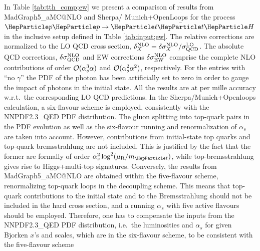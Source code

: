\documentclass[11pt]{cernrep}
\begin{document}
In Table \ref{tab:tth_comp;ew} we present a comparison of results from
{\sc MadGraph5\_aMC@NLO} and {\sc Sherpa/ Munich+OpenLoops} for the
process $\Pp\Pp\to \PQt\bar{\PQt}\PH$ in the inclusive setup defined
in Table \ref{tab:input;ew}. The relative corrections are normalized
to the LO QCD cross section, $\delta^{\rm NLO}_X =\delta\sigma^{\rm
  NLO}_X/\sigma^{\rm LO}_{\rm QCD}$.  The absolute QCD corrections, $
\delta\sigma^{\rm NLO}_{\rm QCD}$ and EW corrections
$\delta\sigma^{\rm NLO}_{\rm EW}$ comprise the complete NLO
contributions of order ${\cal O}(\alpha^3_s\alpha)$ and ${\cal
  O}(\alpha^2_s\alpha^2)$, respectively.  For the entries with ``no
$\gamma$'' the PDF of the photon has been artificially set to zero in
order to gauge the impact of photons in the initial state.  All the
results are at per mille accuracy w.r.t.~the corresponding LO QCD
predictions. In the {\sc Sherpa/Munich+Openloops} calculation, a
six-flavour scheme is employed, consistently with the NNPDF2.3\_QED
PDF distribution. The gluon splitting into top-quark pairs in the PDF
evolution as well as the six-flavour running and renormalization of
$\alpha_s$ are taken into account.  However, contributions from
initial-state top quarks and top-quark bremsstrahlung are not
included. This is justified by the fact that the former are formally
of order $\alpha_s^2\log^2(\mu_{\rm R}/m_{\PQt})$, while
top-bremsstrahlung gives rise to Higgs+multi-top signatures.
Conversely, the results from {\sc MadGraph5\_aMC@NLO} are obtained
within the five-flavour scheme, renormalizing top-quark loops in the
decoupling scheme. This means that top-quark contributions to the
initial state and to the Bremsstrahlung should not be included in the
hard cross section, and a running $\alpha_s$ with five active flavours
should be employed.  Therefore, one has to compensate the inputs from
the NNPDF2.3\_QED PDF distribution, i.e.\ the luminosities and
$\alpha_s$ for given Bjorken $x$'s and scales, which are in the
six-flavour scheme, to be consistent with the five-flavour scheme
\end{document}
